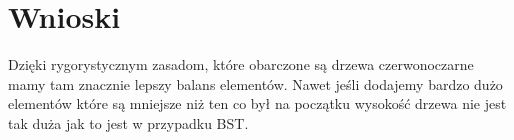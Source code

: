 \documentclass[14pt]{article}
\begin{document}
\begin{center}
\end{center}

\section{Wnioski}

Dzięki rygorystycznym zasadom, które obarczone są drzewa czerwonoczarne mamy tam znacznie lepszy balans elementów. Nawet jeśli dodajemy bardzo dużo elementów które są mniejsze niż ten co był na początku wysokość drzewa nie jest tak duża jak to jest w przypadku BST.
\end{document}
